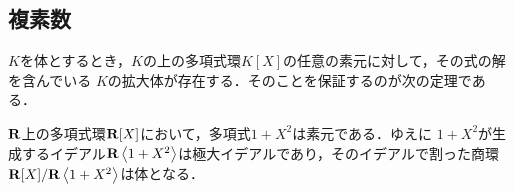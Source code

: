 \subsection{複素数}
	$K$を体とするとき，$K$の上の多項式環$K[X]$の任意の素元に対して，その式の解を含んでいる
	$K$の拡大体が存在する．そのことを保証するのが次の定理である．
	
	\begin{screen}
		\begin{thm}[単拡大]
		\end{thm}
	\end{screen}
	
	$\mathbf{R}$上の多項式環$\mathbf{R}[X]$において，多項式$1 + X^2$は素元である．ゆえに
	$1+X^2$が生成するイデアル$\R\inprod<1+X^2>$は極大イデアルであり，そのイデアルで割った商環
	$\R[X]/\R\inprod<1+X^2>$は体となる．
	
